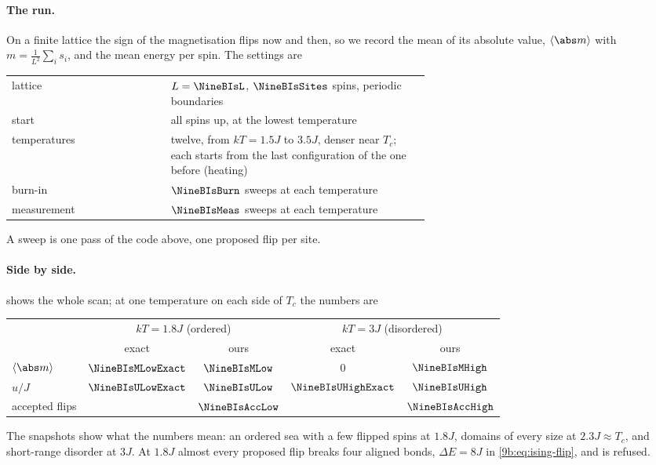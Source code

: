 \paragraph{The run.}
On a finite lattice the sign of the magnetisation flips now and then, so we record the mean of
its absolute value, $\langle\abs m\rangle$ with $m=\frac1{L^2}\sum_is_i$, and the mean energy per
spin. The settings are
\begin{center}
\begin{tabular}{lp{0.62\linewidth}}
\toprule
lattice & $L=\NineBIsL$, $\NineBIsSites$ spins, periodic boundaries\\
start & all spins up, at the lowest temperature\\
temperatures & twelve, from $kT=1.5J$ to $3.5J$, denser near $T_c$; each starts from the
last configuration of the one before (heating)\\
burn-in & $\NineBIsBurn$ sweeps at each temperature\\
measurement & $\NineBIsMeas$ sweeps at each temperature\\
\bottomrule
\end{tabular}
\end{center}
A sweep is one pass of the code above, one proposed flip per site.

\paragraph{Side by side.}
 shows the whole scan; at one temperature on each side of $T_c$ the numbers are
\begin{center}
\begin{tabular}{lcccc}
\toprule
 & \multicolumn{2}{c}{$kT=1.8J$ (ordered)} & \multicolumn{2}{c}{$kT=3J$ (disordered)}\\
 & exact & ours & exact & ours\\
\midrule
$\langle\abs m\rangle$ & $\NineBIsMLowExact$ & $\NineBIsMLow$ & $0$ & $\NineBIsMHigh$\\
$u/J$ & $\NineBIsULowExact$ & $\NineBIsULow$ & $\NineBIsUHighExact$ & $\NineBIsUHigh$\\
accepted flips & & $\NineBIsAccLow$ & & $\NineBIsAccHigh$\\
\bottomrule
\end{tabular}
\end{center}
The snapshots show what the numbers mean: an ordered sea with a few flipped spins at $1.8J$,
domains of every size at $2.3J\approx T_c$, and short-range disorder at $3J$. At $1.8J$ almost
every proposed flip breaks four aligned bonds, $\Delta E=8J$ in \eqref{9b:eq:ising-flip}, and is
refused.

